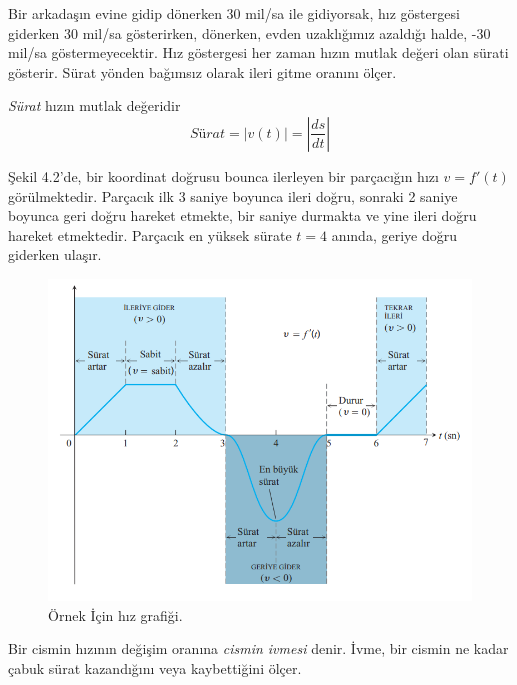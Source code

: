 Bir arkadaşın evine gidip dönerken 30 mil/sa ile gidiyorsak, hız göstergesi giderken 30 mil/sa gösterirken, dönerken, evden uzaklığımız azaldığı halde, -30 mil/sa göstermeyecektir. Hız göstergesi her zaman hızın mutlak değeri olan sürati gösterir. Sürat yönden bağımsız olarak ileri gitme oranını ölçer.
\begin{tanim}
	\textit{Sürat} hızın mutlak değeridir
	\begin{equation*}
	\textit{Sürat} = |v(t)|=\left| \frac{ds}{dt}\right|
	\end{equation*}
\end{tanim}
\begin{ornek}
	Şekil 4.2'de, bir koordinat doğrusu bounca ilerleyen bir parçacığın hızı $v = f'(t)$ görülmektedir. Parçacık ilk 3 saniye boyunca ileri doğru, sonraki 2 saniye boyunca geri doğru hareket etmekte, bir saniye durmakta ve yine ileri doğru hareket etmektedir. Parçacık en yüksek sürate $t=4$ anında, geriye doğru giderken ulaşır.
\begin{figure}[H]
	\centering
	\includegraphics[width=0.7\linewidth]{hizornek2.png}
	\caption{Örnek İçin hız grafiği.}
	\label{fig:ornekresim}
\end{figure}
\end{ornek}
Bir cismin hızının değişim oranına \textit{cismin ivmesi} denir. İvme, bir cismin ne kadar çabuk sürat kazandığını veya kaybettiğini ölçer.\\

